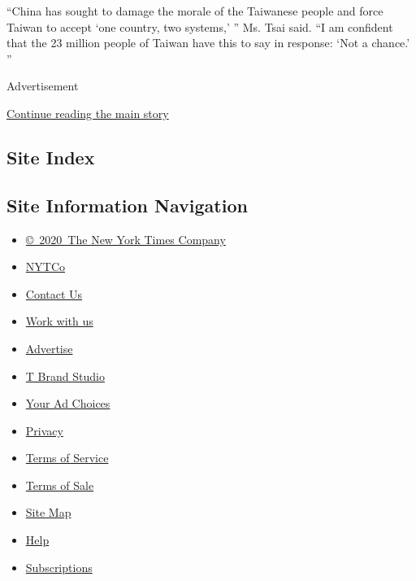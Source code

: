 ``China has sought to damage the morale of the Taiwanese people and
force Taiwan to accept `one country, two systems,' '' Ms. Tsai said. ``I
am confident that the 23 million people of Taiwan have this to say in
response: `Not a chance.' ''

Advertisement

\protect\hyperlink{after-bottom}{Continue reading the main story}

\hypertarget{site-index}{%
\subsection{Site Index}\label{site-index}}

\hypertarget{site-information-navigation}{%
\subsection{Site Information
Navigation}\label{site-information-navigation}}

\begin{itemize}
\tightlist
\item
  \href{https://help.nytimes.com/hc/en-us/articles/115014792127-Copyright-notice}{©~2020~The
  New York Times Company}
\end{itemize}

\begin{itemize}
\tightlist
\item
  \href{https://www.nytco.com/}{NYTCo}
\item
  \href{https://help.nytimes.com/hc/en-us/articles/115015385887-Contact-Us}{Contact
  Us}
\item
  \href{https://www.nytco.com/careers/}{Work with us}
\item
  \href{https://nytmediakit.com/}{Advertise}
\item
  \href{http://www.tbrandstudio.com/}{T Brand Studio}
\item
  \href{https://www.nytimes.com/privacy/cookie-policy\#how-do-i-manage-trackers}{Your
  Ad Choices}
\item
  \href{https://www.nytimes.com/privacy}{Privacy}
\item
  \href{https://help.nytimes.com/hc/en-us/articles/115014893428-Terms-of-service}{Terms
  of Service}
\item
  \href{https://help.nytimes.com/hc/en-us/articles/115014893968-Terms-of-sale}{Terms
  of Sale}
\item
  \href{https://spiderbites.nytimes.com}{Site Map}
\item
  \href{https://help.nytimes.com/hc/en-us}{Help}
\item
  \href{https://www.nytimes.com/subscription?campaignId=37WXW}{Subscriptions}
\end{itemize}
